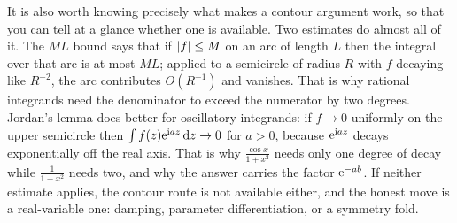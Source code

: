 It is also worth knowing precisely what makes a contour argument work, so that you can tell at a glance whether one is available. Two estimates do almost all of it. The $ML$ bound says that if $\left\lvert f\right\rvert\leq M$ on an arc of length $L$ then the integral over that arc is at most $ML$; applied to a semicircle of radius $R$ with $f$ decaying like $R^{-2}$, the arc contributes $O(R^{-1})$ and vanishes. That is why rational integrands need the denominator to exceed the numerator by two degrees. Jordan's lemma does better for oscillatory integrands: if $f\to0$ uniformly on the upper semicircle then $\int f(z)\mathrm{e}^{\mathrm{i} az}\,\mathrm{d} z\to0$ for $a>0$, because $\mathrm{e}^{\mathrm{i} az}$ decays exponentially off the real axis. That is why $\frac{\cos x}{1+x^{2}}$ needs only one degree of decay while $\frac{1}{1+x^{2}}$ needs two, and why the answer carries the factor $\mathrm{e}^{-ab}$. If neither estimate applies, the contour route is not available either, and the honest move is a real-variable one: damping, parameter differentiation, or a symmetry fold.

\begin{center}
\end{center}

